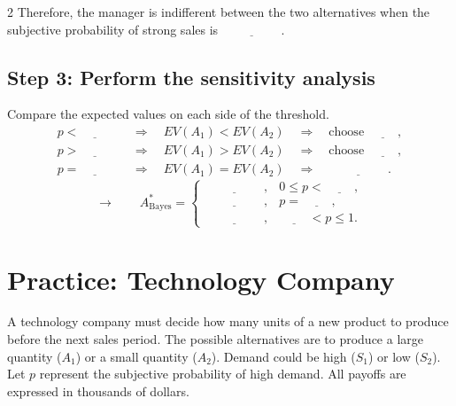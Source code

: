 \begin{multicols}{2}
	Therefore, the manager is indifferent between the two alternatives when
	the subjective probability of strong sales is
	$\underline{\hspace{2cm}}$.
	
	\subsection*{Step 3: Perform the sensitivity analysis}
	
	Compare the expected values on each side of the threshold.
	\[
	\begin{aligned}
		p<\underline{\hspace{1cm}}
		&\quad\Rightarrow\quad
		EV(A_1)<EV(A_2)
		\quad\Rightarrow\quad
		\text{choose } \underline{\hspace{1cm}},
		\\[2mm]
		p>\underline{\hspace{1cm}}
		&\quad\Rightarrow\quad
		EV(A_1)>EV(A_2)
		\quad\Rightarrow\quad
		\text{choose } \underline{\hspace{1cm}},
		\\[2mm]
		p=\underline{\hspace{1cm}}
		&\quad\Rightarrow\quad
		EV(A_1)=EV(A_2)
		\quad\Rightarrow\quad
		\underline{\hspace{2cm}}.
	\end{aligned}
	\]
	\[
	\longrightarrow \qquad \boxed{
		A^*_{\mathrm{Bayes}} = \begin{cases}
			\underline{\hspace{2cm}}, & 0\leq p<\underline{\hspace{1cm}},\\
			\underline{\hspace{2cm}}, & p=\underline{\hspace{1cm}},\\
			\underline{\hspace{2cm}}, & \underline{\hspace{1cm}}<p\leq1.
	\end{cases}}
	\]
	
	
	\columnbreak 
	
	\section{Practice: Technology Company}
	
	A technology company must decide how many units of a new product to
	produce before the next sales period. The possible alternatives are to
	produce a large quantity ($A_1$) or a small quantity ($A_2$). Demand could be high ($S_1$) or low ($S_2$). Let $p$ represent the
	subjective probability of high demand. All payoffs are expressed in thousands of dollars.
	

\end{multicols}
